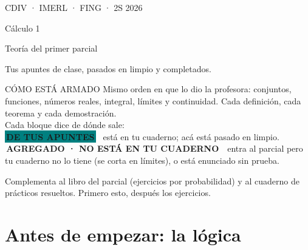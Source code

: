 \thispagestyle{empty}
\vspace*{18mm}
{\ttfamily\small\color{suave} CDIV · IMERL · FING · 2S 2026}\par\vspace{3mm}
{\plexbold\fontsize{26}{30}\selectfont Cálculo 1}\par\vspace{1mm}
{\plexbold\fontsize{17}{21}\selectfont\color{rojo} Teoría del primer parcial}\par\vspace{4mm}
{\large Tus apuntes de clase, pasados en limpio y completados.}\par\vspace{10mm}
\begin{sello}{CÓMO ESTÁ ARMADO}
Mismo orden en que lo dio la profesora: conjuntos, funciones, números reales, integral, límites y continuidad. Cada definición, cada teorema y cada demostración.\\[3pt]
Cada bloque dice de dónde sale:\\[2pt]
{\ttfamily\scriptsize\colorbox{teal}{\color{papel}\bfseries\,DE TUS APUNTES\,}} \ está en tu cuaderno; acá está pasado en limpio.\\[2pt]
{\ttfamily\scriptsize\colorbox{naranja}{\color{papel}\bfseries\,AGREGADO · NO ESTÁ EN TU CUADERNO\,}} \ entra al parcial pero tu cuaderno no lo tiene (se corta en límites), o está enunciado sin prueba.
\end{sello}
\vfill
{\small\color{suave} Complementa al libro del parcial (ejercicios por probabilidad) y al cuaderno de prácticos resueltos. Primero esto, después los ejercicios.\par}
\newpage

{\hypersetup{linkcolor=tinta}\renewcommand{\contentsname}{Índice}\tableofcontents}
\newpage

\chapter*{Antes de empezar: la lógica}

